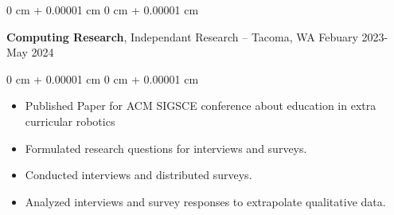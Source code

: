 \documentclass[10pt, letterpaper]{article}
\newenvironment{highlights}{
    \begin{itemize}[
        topsep=0.10 cm,
        parsep=0.10 cm,
        partopsep=0pt,
        itemsep=0pt,
        leftmargin=0 cm + 10pt
    ]
}{
    \end{itemize}
} %
\newenvironment{onecolentry}{
    \begin{adjustwidth}{
        0 cm + 0.00001 cm
    }{
        0 cm + 0.00001 cm
    }
}{
    \end{adjustwidth}
} %
\newenvironment{twocolentry}[2][]{
    \onecolentry
    \def\secondColumn{#2}
    \setcolumnwidth{\fill, 4.5 cm}
    \begin{paracol}{2}
}{
    \switchcolumn \raggedleft \secondColumn
    \end{paracol}
    \endonecolentry
} %
\begin{document}
        \vspace{0.2 cm}

        \begin{twocolentry}{
            Febuary 2023- May 2024
        }
            \textbf{Computing Research}, Independant Research -- Tacoma, WA\end{twocolentry}

        \vspace{0.20 cm}
        \begin{onecolentry}
            \begin{highlights}
              \item Published Paper for ACM SIGSCE conference about education in extra curricular robotics
              \item Formulated research questions for interviews and surveys.
              \item Conducted interviews and distributed surveys.
              \item Analyzed interviews and survey responses to extrapolate qualitative data.
            \end{highlights}
        \end{onecolentry}
        \vspace{0.2 cm}
\end{document}
